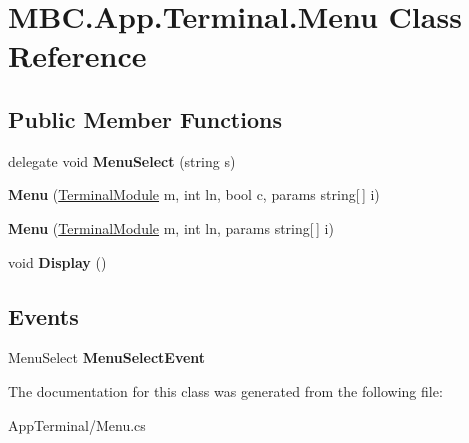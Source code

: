 \hypertarget{class_m_b_c_1_1_app_1_1_terminal_1_1_menu}{\section{M\-B\-C.\-App.\-Terminal.\-Menu Class Reference}
\label{class_m_b_c_1_1_app_1_1_terminal_1_1_menu}
}
\subsection*{Public Member Functions}
\begin{DoxyCompactItemize}
\item 
\hypertarget{class_m_b_c_1_1_app_1_1_terminal_1_1_menu_aa362a86af453315d123d48d9e2e7f407}{delegate void {\bfseries Menu\-Select} (string s)}\label{class_m_b_c_1_1_app_1_1_terminal_1_1_menu_aa362a86af453315d123d48d9e2e7f407}

\item 
\hypertarget{class_m_b_c_1_1_app_1_1_terminal_1_1_menu_af84e7732730b3264754893c073740372}{{\bfseries Menu} (\hyperlink{class_m_b_c_1_1_app_1_1_terminal_1_1_terminal_module}{Terminal\-Module} m, int ln, bool c, params string\mbox{[}$\,$\mbox{]} i)}\label{class_m_b_c_1_1_app_1_1_terminal_1_1_menu_af84e7732730b3264754893c073740372}

\item 
\hypertarget{class_m_b_c_1_1_app_1_1_terminal_1_1_menu_a0eb00409a07f0348a9e0141c8bb846ae}{{\bfseries Menu} (\hyperlink{class_m_b_c_1_1_app_1_1_terminal_1_1_terminal_module}{Terminal\-Module} m, int ln, params string\mbox{[}$\,$\mbox{]} i)}\label{class_m_b_c_1_1_app_1_1_terminal_1_1_menu_a0eb00409a07f0348a9e0141c8bb846ae}

\item 
\hypertarget{class_m_b_c_1_1_app_1_1_terminal_1_1_menu_aba478950f57d23598277c579a5de4858}{void {\bfseries Display} ()}\label{class_m_b_c_1_1_app_1_1_terminal_1_1_menu_aba478950f57d23598277c579a5de4858}

\end{DoxyCompactItemize}
\subsection*{Events}
\begin{DoxyCompactItemize}
\item 
\hypertarget{class_m_b_c_1_1_app_1_1_terminal_1_1_menu_aaf176c984df01b05087b9618e278facb}{Menu\-Select {\bfseries Menu\-Select\-Event}}\label{class_m_b_c_1_1_app_1_1_terminal_1_1_menu_aaf176c984df01b05087b9618e278facb}

\end{DoxyCompactItemize}


The documentation for this class was generated from the following file\-:\begin{DoxyCompactItemize}
\item 
App\-Terminal/Menu.\-cs\end{DoxyCompactItemize}
